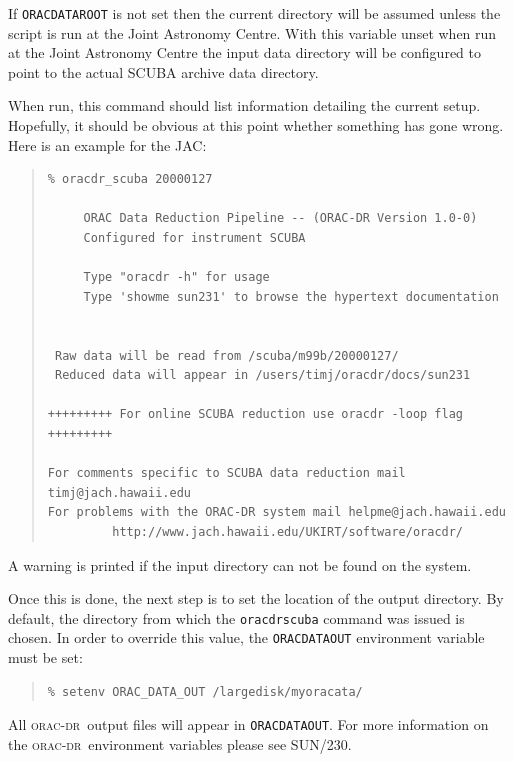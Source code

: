 \documentclass[twoside,11pt]{article}
\newcommand{\xref}[3]{#1}
\renewcommand{\_}{\texttt{\symbol{95}}}
\newcommand{\oracdr}{\xref{\textsc{orac-dr}}{sun230}{}}
\newenvironment{myquote}{\begin{quote}\begin{small}}{\end{small}\end{quote}}
\begin{document}
If \texttt{ORAC\_DATA\_ROOT} is not set then the current directory
will be assumed unless the script is run at the Joint Astronomy Centre.
With this variable unset when run at the Joint Astronomy Centre
the input data directory will be configured to point to the actual
SCUBA archive data directory.

When run, this command should list information detailing the
current setup. Hopefully, it should be obvious at this point
whether something has gone wrong. Here is an example for the JAC:

\begin{myquote}
\begin{verbatim}
% oracdr_scuba 20000127

     ORAC Data Reduction Pipeline -- (ORAC-DR Version 1.0-0)
     Configured for instrument SCUBA

     Type "oracdr -h" for usage
     Type 'showme sun231' to browse the hypertext documentation


 Raw data will be read from /scuba/m99b/20000127/
 Reduced data will appear in /users/timj/oracdr/docs/sun231

+++++++++ For online SCUBA reduction use oracdr -loop flag +++++++++

For comments specific to SCUBA data reduction mail timj@jach.hawaii.edu
For problems with the ORAC-DR system mail helpme@jach.hawaii.edu
         http://www.jach.hawaii.edu/UKIRT/software/oracdr/

\end{verbatim}
\end{myquote}

A warning is printed if the input directory can not be found
on the system.

Once this is done, the next step is to set the location of the
output directory. By default, the directory from which the
\texttt{oracdr\_scuba} command was issued is chosen. In order
to override this value, the \texttt{ORAC\_DATA\_OUT} environment
variable must be set:

\begin{myquote}
\begin{verbatim}
% setenv ORAC_DATA_OUT /largedisk/myoracata/
\end{verbatim}
\end{myquote}

All \oracdr\ output files will appear in \texttt{ORAC\_DATA\_OUT}.
For more information on the \oracdr\ environment variables please
see \xref{SUN/230}{sun230}{shell_variables}.
\end{document}
